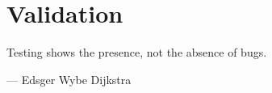 \chapter{Validation}
    \epigraph{Testing shows the presence, not the absence of bugs.}
    {--- Edsger Wybe Dijkstra}
